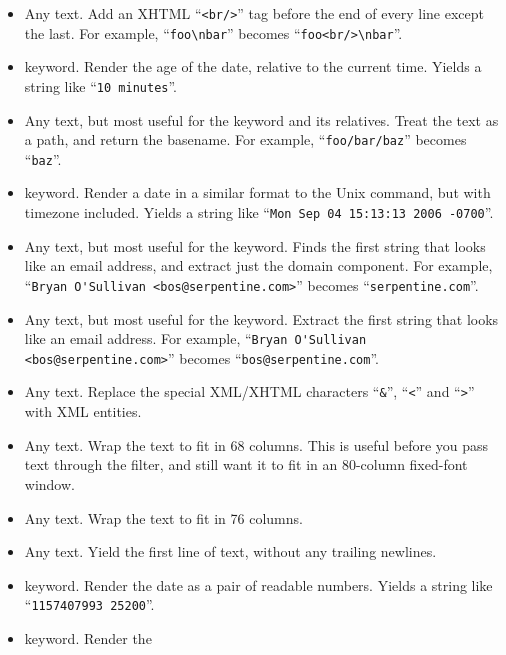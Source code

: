 {{\begin{itemize}
\item[\tplfilter{addbreaks}] Any text. Add an XHTML ``\Verb+<br/>+''
  tag before the end of every line except the last.  For example,
  ``\Verb+foo\nbar+'' becomes ``\Verb+foo<br/>\nbar+''.
\item[\tplkwfilt{date}{age}]  keyword.  Render the
  age of the date, relative to the current time.  Yields a string like
  ``\Verb+10 minutes+''.
\item[\tplfilter{basename}] Any text, but most useful for the
   keyword and its relatives.  Treat the text as a
  path, and return the basename. For example, ``\Verb+foo/bar/baz+''
  becomes ``\Verb+baz+''.
\item[\tplkwfilt{date}{date}]  keyword.  Render a date
  in a similar format to the Unix  command, but with
  timezone included.  Yields a string like
  ``\Verb+Mon Sep 04 15:13:13 2006 -0700+''.
\item[\tplkwfilt{author}{domain}] Any text, but most useful for the
   keyword.  Finds the first string that looks like
  an email address, and extract just the domain component.  For
  example, ``\Verb+Bryan O'Sullivan <bos@serpentine.com>+'' becomes
  ``\Verb+serpentine.com+''.
\item[\tplkwfilt{author}{email}] Any text, but most useful for the
   keyword.  Extract the first string that looks like
  an email address.  For example,
  ``\Verb+Bryan O'Sullivan <bos@serpentine.com>+'' becomes
  ``\Verb+bos@serpentine.com+''.
\item[\tplfilter{escape}] Any text.  Replace the special XML/XHTML
  characters ``\Verb+&+'', ``\Verb+<+'' and ``\Verb+>+'' with
  XML entities.
\item[\tplfilter{fill68}] Any text.  Wrap the text to fit in 68
  columns.  This is useful before you pass text through the
   filter, and still want it to fit in an
  80-column fixed-font window.
\item[\tplfilter{fill76}] Any text.  Wrap the text to fit in 76
  columns.
\item[\tplfilter{firstline}] Any text.  Yield the first line of text,
  without any trailing newlines.
\item[\tplkwfilt{date}{hgdate}]  keyword.  Render the
  date as a pair of readable numbers.  Yields a string like
  ``\Verb+1157407993 25200+''.
\item[\tplkwfilt{date}{isodate}]  keyword.  Render the

\end{itemize}}}
